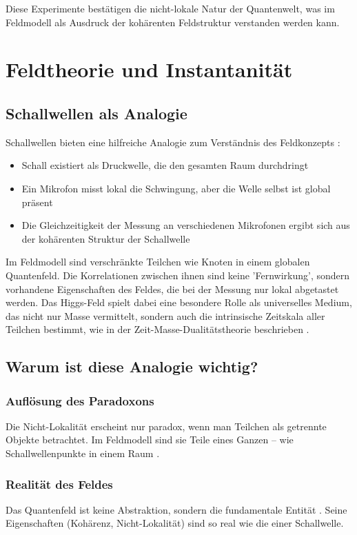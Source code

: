 \documentclass[a4paper,12pt]{article}
\begin{document}
	Diese Experimente bestätigen die nicht-lokale Natur der Quantenwelt, was im Feldmodell als Ausdruck der kohärenten Feldstruktur verstanden werden kann.
	
	\section{Feldtheorie und Instantanität}
	
	\subsection{Schallwellen als Analogie}
	
	Schallwellen bieten eine hilfreiche Analogie zum Verständnis des Feldkonzepts \cite{Bohm1980}:
	\begin{itemize}
		\item Schall existiert als Druckwelle, die den gesamten Raum durchdringt
		\item Ein Mikrofon misst lokal die Schwingung, aber die Welle selbst ist global präsent
		\item Die Gleichzeitigkeit der Messung an verschiedenen Mikrofonen ergibt sich aus der kohärenten Struktur der Schallwelle
	\end{itemize}
	
	Im Feldmodell sind verschränkte Teilchen wie Knoten in einem globalen Quantenfeld. Die Korrelationen zwischen ihnen sind keine 'Fernwirkung', sondern vorhandene Eigenschaften des Feldes, die bei der Messung nur lokal abgetastet werden. Das Higgs-Feld spielt dabei eine besondere Rolle als universelles Medium, das nicht nur Masse vermittelt, sondern auch die intrinsische Zeitskala aller Teilchen bestimmt, wie in der Zeit-Masse-Dualitätstheorie beschrieben \cite{Pascher2024}.
	
	\subsection{Warum ist diese Analogie wichtig?}
	
	\subsubsection{Auflösung des Paradoxons}
	Die Nicht-Lokalität erscheint nur paradox, wenn man Teilchen als getrennte Objekte betrachtet. Im Feldmodell sind sie Teile eines Ganzen – wie Schallwellenpunkte in einem Raum \cite{Bohm1980}.
	
	\subsubsection{Realität des Feldes}
	Das Quantenfeld ist keine Abstraktion, sondern die fundamentale Entität \cite{Weinberg1995}. Seine Eigenschaften (Kohärenz, Nicht-Lokalität) sind so real wie die einer Schallwelle.
	
\end{document}
